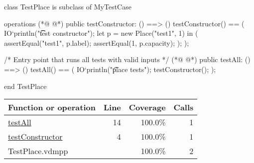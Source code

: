 \begin{vdmpp}
class TestPlace is subclass of MyTestCase

operations
(*@
\label{testConstructor:4}
@*)
  public testConstructor: () ==> ()
  testConstructor() == (
    IO`println("\t\t test constructor");
    let p = new Place("test1", 1) in (
      assertEqual("test1", p.label);
      assertEqual(1,  p.capacity);
    );
  );

  /* Entry point that runs all tests with valid inputs */
(*@
\label{testAll:14}
@*)
  public testAll: () ==> ()
  testAll() == (
    IO`println("\t place tests");
    testConstructor();
  );

end TestPlace
\end{vdmpp}
\bigskip
\begin{longtable}{|l|r|r|r|}
\hline
Function or operation & Line & Coverage & Calls \\
\hline
\hline
\hyperref[testAll:14]{testAll} & 14&100.0\% & 1 \\
\hline
\hyperref[testConstructor:4]{testConstructor} & 4&100.0\% & 1 \\
\hline
\hline
TestPlace.vdmpp & & 100.0\% & 2 \\
\hline
\end{longtable}